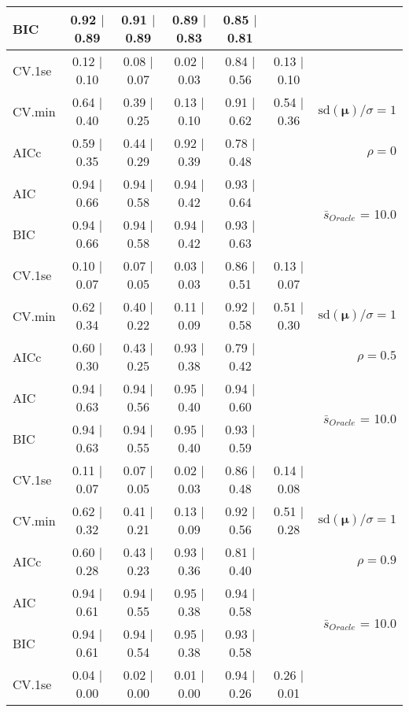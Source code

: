\begin{table}
\begin{center}
\begin{tabular}{l*{5}{c}|r}
BIC & 0.92 $\mid$ 0.89 & 0.91 $\mid$ 0.89 & 0.89 $\mid$ 0.83 & 0.85 $\mid$ 0.81 & &  \\
 \hline 
CV.1se & 0.12 $\mid$ 0.10 & 0.08 $\mid$ 0.07 & 0.02 $\mid$ 0.03 & 0.84 $\mid$ 0.56 & 0.13 $\mid$ 0.10 & \\
CV.min & 0.64 $\mid$ 0.40 & 0.39 $\mid$ 0.25 & 0.13 $\mid$ 0.10 & 0.91 $\mid$ 0.62 & 0.54 $\mid$ 0.36 &  $\mathrm{sd}(\mathbf{\mu})/\sigma=1$ \\
AICc & 0.59 $\mid$ 0.35 & 0.44 $\mid$ 0.29 & 0.92 $\mid$ 0.39 & 0.78 $\mid$ 0.48 & & $\rho=0$ \\
AIC & 0.94 $\mid$ 0.66 & 0.94 $\mid$ 0.58 & 0.94 $\mid$ 0.42 & 0.93 $\mid$ 0.64 & &  \multirow{2}{*}{$\bar{s}_{Oracle}$ = 10.0} \\
BIC & 0.94 $\mid$ 0.66 & 0.94 $\mid$ 0.58 & 0.94 $\mid$ 0.42 & 0.93 $\mid$ 0.63 & &  \\
 \hline 
CV.1se & 0.10 $\mid$ 0.07 & 0.07 $\mid$ 0.05 & 0.03 $\mid$ 0.03 & 0.86 $\mid$ 0.51 & 0.13 $\mid$ 0.07 & \\
CV.min & 0.62 $\mid$ 0.34 & 0.40 $\mid$ 0.22 & 0.11 $\mid$ 0.09 & 0.92 $\mid$ 0.58 & 0.51 $\mid$ 0.30 &  $\mathrm{sd}(\mathbf{\mu})/\sigma=1$ \\
AICc & 0.60 $\mid$ 0.30 & 0.43 $\mid$ 0.25 & 0.93 $\mid$ 0.38 & 0.79 $\mid$ 0.42 & & $\rho=0.5$ \\
AIC & 0.94 $\mid$ 0.63 & 0.94 $\mid$ 0.56 & 0.95 $\mid$ 0.40 & 0.94 $\mid$ 0.60 & &  \multirow{2}{*}{$\bar{s}_{Oracle}$ = 10.0} \\
BIC & 0.94 $\mid$ 0.63 & 0.94 $\mid$ 0.55 & 0.95 $\mid$ 0.40 & 0.93 $\mid$ 0.59 & &  \\
 \hline 
CV.1se & 0.11 $\mid$ 0.07 & 0.07 $\mid$ 0.05 & 0.02 $\mid$ 0.03 & 0.86 $\mid$ 0.48 & 0.14 $\mid$ 0.08 & \\
CV.min & 0.62 $\mid$ 0.32 & 0.41 $\mid$ 0.21 & 0.13 $\mid$ 0.09 & 0.92 $\mid$ 0.56 & 0.51 $\mid$ 0.28 &  $\mathrm{sd}(\mathbf{\mu})/\sigma=1$ \\
AICc & 0.60 $\mid$ 0.28 & 0.43 $\mid$ 0.23 & 0.93 $\mid$ 0.36 & 0.81 $\mid$ 0.40 & & $\rho=0.9$ \\
AIC & 0.94 $\mid$ 0.61 & 0.94 $\mid$ 0.55 & 0.95 $\mid$ 0.38 & 0.94 $\mid$ 0.58 & &  \multirow{2}{*}{$\bar{s}_{Oracle}$ = 10.0} \\
BIC & 0.94 $\mid$ 0.61 & 0.94 $\mid$ 0.54 & 0.95 $\mid$ 0.38 & 0.93 $\mid$ 0.58 & &  \\
 \hline 
CV.1se & 0.04 $\mid$ 0.00 & 0.02 $\mid$ 0.00 & 0.01 $\mid$ 0.00 & 0.94 $\mid$ 0.26 & 0.26 $\mid$ 0.01 & \\

\end{tabular}
\end{center}
\end{table}
